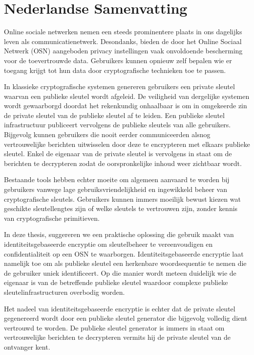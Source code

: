 \chapter{Nederlandse Samenvatting}
\label{app:C}

\renewcommand{\figurename}{Figuur}

\enlargethispage{\baselineskip}
Online sociale netwerken nemen een steeds prominentere plaats in ons dagelijks leven als communicatienetwerk. Desondanks, bieden de door het Online Sociaal Netwerk (OSN) aangeboden privacy instellingen vaak onvoldoende bescherming voor de toevertrouwde data. Gebruikers kunnen opnieuw zelf bepalen wie er toegang krijgt tot hun data door cryptografische technieken toe te passen. 

In klassieke cryptografische systemen genereren gebruikers een private sleutel waarvan een publieke sleutel wordt afgeleid. De veiligheid van dergelijke systemen wordt gewaarborgd doordat het rekenkundig onhaalbaar is om in omgekeerde zin de private sleutel van de publieke sleutel af te leiden. Een publieke sleutel infrastructuur publiceert vervolgens de publieke sleutels van alle gebruikers. Bijgevolg kunnen gebruikers die nooit eerder communiceerden alsnog vertrouwelijke berichten uitwisselen door deze te encrypteren met elkaars publieke sleutel. Enkel de eigenaar van de private sleutel is vervolgens in staat om de berichten te decrypteren zodat de oorspronkelijke inhoud weer zichtbaar wordt.

Bestaande tools hebben echter moeite om algemeen aanvaard te worden bij gebruikers vanwege lage gebruiksvriendelijkheid en ingewikkeld beheer van cryptografische sleutels. Gebruikers kunnen immers moeilijk bewust kiezen wat geschikte sleutellengtes zijn of welke sleutels te vertrouwen zijn, zonder kennis van cryptografische primitieven.

In deze thesis, suggereren we een praktische oplossing die gebruik maakt van identiteitsgebaseerde encryptie om sleutelbeheer te vereenvoudigen en confidentialiteit op een OSN te waarborgen. Identiteitsgebaseerde encryptie laat namelijk toe om als publieke sleutel een herkenbare woordsequentie te nemen die de gebruiker uniek identificeert. Op die manier wordt meteen duidelijk wie de eigenaar is van de betreffende publieke sleutel waardoor complexe publieke sleutelinfrastructuren overbodig worden. 

Het nadeel van identiteitsgebaseerde encryptie is echter dat de private sleutel gegenereerd wordt door een publieke sleutel generator die bijgevolg volledig dient vertrouwd te worden. De publieke sleutel generator is immers in staat om vertrouwelijke berichten te decrypteren vermits hij de private sleutel van de ontvanger kent.

